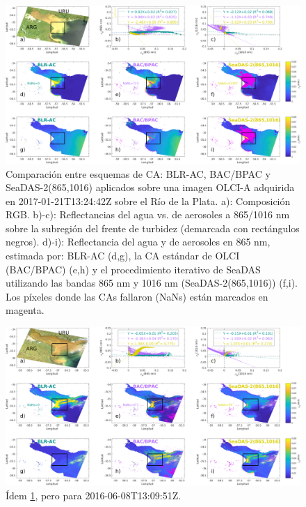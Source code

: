             \begin{figure}
            \centering
            \includegraphics[width=\textwidth]{blr/figures/ACInter1.png}
            \caption[Comparación entre esquemas de CA: BLR-AC, BAC/BPAC y SeaDAS-2(865,1016) aplicados sobre una imagen OLCI-A adquirida en 2017-01-21T13:24:42Z sobre el Río de la Plata.]{Comparación entre esquemas de CA: BLR-AC, BAC/BPAC y SeaDAS-2(865,1016) aplicados sobre una imagen OLCI-A adquirida en 2017-01-21T13:24:42Z sobre el Río de la Plata. a): Composición RGB. b)-c): Reflectancias del agua vs. de aerosoles a 865/1016 nm sobre la subregión del frente de turbidez (demarcada con rectángulos negros). d)-i): Reflectancia del agua y de aerosoles en 865 nm, estimada por: BLR-AC (d,g), la CA estándar de OLCI (BAC/BPAC) (e,h) y el procedimiento iterativo de SeaDAS utilizando las bandas 865 nm y 1016 nm (SeaDAS-2(865,1016)) (f,i). Los píxeles donde las CAs fallaron (NaNs) están marcados en magenta.}
            \label{blr:ACInter1}
            \end{figure}
            
            \begin{figure}
            \centering
            \includegraphics[width=\textwidth]{blr/figures/ACInter2.png}
            \caption{Ídem \ref{blr:ACInter1}, pero para 2016-06-08T13:09:51Z.}
            \label{blr:ACInter2}
            \end{figure}
            
